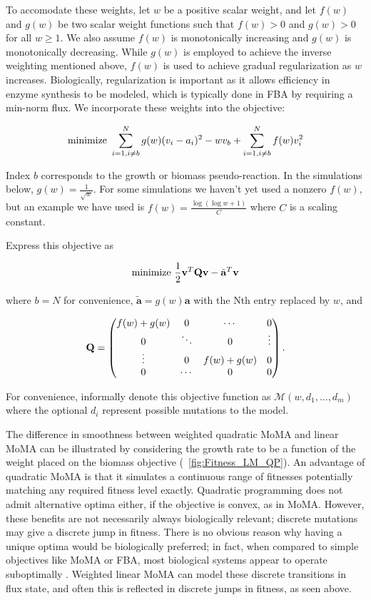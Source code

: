 To accomodate these weights, let $w$ be a positive scalar weight, and
let $f(w)$ and $g(w)$ be two scalar weight functions such that $f(w) >
0$ and $g(w) > 0$ for all $w \ge 1$. We also assume $f(w)$ is
monotonically increasing and $g(w)$ is monotonically decreasing. While
$g(w)$ is employed to achieve the inverse weighting mentioned above,
$f(w)$ is used to achieve gradual regularization as $w$
increases. Biologically, regularization is important as it allows
efficiency in enzyme synthesis to be modeled, which is typically done
in FBA by requiring a min-norm flux.  We incorporate these weights
into the objective:

\[ \textnormal{minimize}\ \sum^N_{i=1,i\ne b}g(w)(v_i-a_i)^2 - w v_b + \sum^N_{i=1,i\ne b}f(w)v^2_i \]

Index $b$ corresponds to the growth or biomass pseudo-reaction.  In
the simulations below, $g(w) = \frac{1}{\sqrt{w}}$. For some
simulations we haven't yet used a nonzero $f(w)$, but an example we
have used is $f(w) = \frac{\log{(\log{w}+1)}}{C}$ where $C$ is a
scaling constant.

  
Express this objective as

\[ \textnormal{minimize}\ \frac{1}{2}\mathbf{v}^T \mathbf{Q v} - \tilde{\mathbf{a}}^T \mathbf{v}\]

where $b = N$ for convenience, $\tilde{\mathbf{a}} = g(w)\mathbf{a}$
with the Nth entry replaced by $w$, and

\[ \mathbf{Q} = \begin{pmatrix}
f(w)+g(w) & 0       & \cdots    & 0 \\
0         & \ddots  & 0         & \vdots \\
\vdots    & 0       & f(w)+g(w) & 0 \\
0         & \cdots  & 0         & 0  
\end{pmatrix}\textnormal{.}\]

For convenience, informally denote this objective function as
$\mathcal{M}(w,d_1,\dots,d_m)$ where the optional $d_i$ represent
possible mutations to the model.

The difference in smoothness between weighted quadratic MoMA and linear
MoMA can be illustrated by considering the growth rate to be a
function of the weight placed on the biomass objective
(\Fig~\ref{fig:Fitness_LM_QP}).  An advantage of quadratic MoMA is
that it simulates a continuous range of fitnesses 
potentially matching any required fitness level exactly.  Quadratic
programming does not admit alternative optima either, if the objective
is convex, as in MoMA. However, these benefits are not necessarily
always biologically relevant; discrete mutations may give a discrete
jump in fitness. There is no obvious reason why having a unique optima
would be biologically preferred; in fact, when compared to simple
objectives like MoMA or FBA, most biological systems appear to operate
suboptimally \citep{Schuetz2012}. Weighted linear MoMA can model these
discrete transitions in flux state, and often this is reflected in
discrete jumps in fitness, as seen above.

